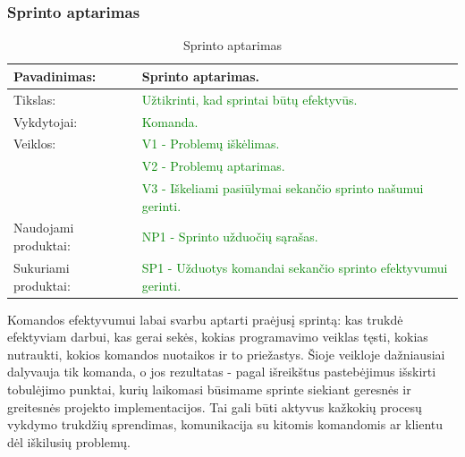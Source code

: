 \documentclass{VUMIFPSkursinis}
\begin{document}
	\subsubsection{Sprinto aptarimas}
	\begin{center}
		\begin{table}[ht]
			\caption{Sprinto aptarimas}
			\begin{tabular}{ | l | l | }
				\hline
				Pavadinimas:         & Sprinto aptarimas.							\\ \hline
				Tikslas:             & \textcolor{green}{Užtikrinti, kad sprintai būtų efektyvūs.}				\\ \hline
				Vykdytojai:          & \textcolor{green}{ Komanda.}								\\ \hline
				Veiklos:             & \textcolor{green}{ V1 - Problemų iškėlimas.}						\\
				                     & \textcolor{green}{V2 - Problemų aptarimas.}						\\
				                     & \textcolor{green}{V3 - Iškeliami pasiūlymai sekančio sprinto našumui gerinti.}		\\ \hline
				Naudojami produktai: & \textcolor{green}{NP1 - Sprinto užduočių sąrašas. 	}				\\ \hline
				Sukuriami produktai: & \textcolor{green}{SP1 - Užduotys komandai sekančio sprinto efektyvumui gerinti.}	\\ \hline
			\end{tabular}
		\end{table}
	\end{center}
	Komandos efektyvumui labai svarbu aptarti praėjusį sprintą: kas trukdė efektyviam darbui, kas gerai sekės, kokias programavimo veiklas tęsti, kokias nutraukti, kokios komandos nuotaikos ir to priežastys.
	Šioje veikloje dažniausiai dalyvauja tik komanda, o jos rezultatas - pagal išreikštus pastebėjimus išskirti tobulėjimo punktai, kurių laikomasi būsimame sprinte siekiant geresnės ir greitesnės projekto implementacijos.
	Tai gali būti aktyvus kažkokių procesų vykdymo trukdžių sprendimas, komunikacija su kitomis komandomis ar klientu dėl iškilusių problemų.

	\newpage
\end{document}

